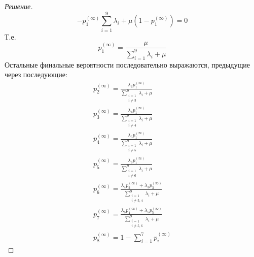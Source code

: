 \documentclass[12pt,a4paper]{article}
\begin{document}
\begin{proof}[Решение]
\begin{equation*}
		-p_1^{(\infty)} \sum_{i=1}^{9}{\lambda_i} + \mu (1 - p_1^{(\infty)}) = 0
	\end{equation*}
	Т.е.
	\begin{equation*}
		p_1^{(\infty)} = \frac{\mu}{\sum_{i=1}^{9}{\lambda_i} + \mu}
	\end{equation*}
	Остальные финальные вероятности последовательно выражаются, предыдущие через последующие:
	\begin{align*}
		p_2^{(\infty)} = \frac{\lambda_3 p_1^{(\infty)}}{\sum_{\substack{i = 1 \\ i \neq 3}}^{9}{\lambda_i} + \mu} \\
		p_3^{(\infty)} = \frac{\lambda_4 p_1^{(\infty)}}{\sum_{\substack{i = 1 \\ i \neq 4}}^{9}{\lambda_i} + \mu} \\
		p_4^{(\infty)} = \frac{\lambda_5 p_1^{(\infty)}}{\sum_{\substack{i = 1 \\ i \neq 5}}^{9}{\lambda_i} + \mu} \\
		p_5^{(\infty)} = \frac{\lambda_6 p_1^{(\infty)}}{\sum_{\substack{i = 1 \\ i \neq 6}}^{9}{\lambda_i} + \mu} \\
		p_6^{(\infty)} = \frac{\lambda_4 p_2^{(\infty)} + \lambda_3 p_3^{(\infty)}}{\sum_{\substack{i = 1 \\ i \neq 3, 4}}^{9}{\lambda_i} + \mu} \\
		p_7^{(\infty)} = \frac{\lambda_6 p_4^{(\infty)} + \lambda_5 p_5^{(\infty)}}{\sum_{\substack{i = 1 \\ i \neq 5, 6}}^{9}{\lambda_i} + \mu} \\
		p_8^{(\infty)} = 1 - \sum_{i=1}^{7}{p_i^{(\infty)}}
	\end{align*}
\end{proof}
\end{document}
